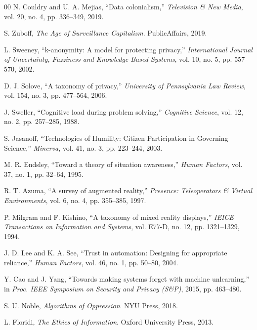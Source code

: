 \documentclass[conference]{IEEEtran}
\begin{document}
\begin{thebibliography}{00}
 N. Couldry and U. A. Mejias, ``Data colonialism,'' \textit{Television \& New Media}, vol. 20, no. 4, pp. 336--349, 2019.

 S. Zuboff, \textit{The Age of Surveillance Capitalism}. PublicAffairs, 2019.

 L. Sweeney, ``k-anonymity: A model for protecting privacy,'' \textit{International Journal of Uncertainty, Fuzziness and Knowledge-Based Systems}, vol. 10, no. 5, pp. 557--570, 2002.

 D. J. Solove, ``A taxonomy of privacy,'' \textit{University of Pennsylvania Law Review}, vol. 154, no. 3, pp. 477--564, 2006.

 J. Sweller, ``Cognitive load during problem solving,'' \textit{Cognitive Science}, vol. 12, no. 2, pp. 257--285, 1988.

 S. Jasanoff, ``Technologies of Humility: Citizen Participation in Governing Science,'' \textit{Minerva}, vol. 41, no. 3, pp. 223--244, 2003.

 M. R. Endsley, ``Toward a theory of situation awareness,'' \textit{Human Factors}, vol. 37, no. 1, pp. 32--64, 1995.

 R. T. Azuma, ``A survey of augmented reality,'' \textit{Presence: Teleoperators \& Virtual Environments}, vol. 6, no. 4, pp. 355--385, 1997.

 P. Milgram and F. Kishino, ``A taxonomy of mixed reality displays,'' \textit{IEICE Transactions on Information and Systems}, vol. E77-D, no. 12, pp. 1321--1329, 1994.

 J. D. Lee and K. A. See, ``Trust in automation: Designing for appropriate reliance,'' \textit{Human Factors}, vol. 46, no. 1, pp. 50--80, 2004.

 Y. Cao and J. Yang, ``Towards making systems forget with machine unlearning,'' in \textit{Proc. IEEE Symposium on Security and Privacy (S\&P)}, 2015, pp. 463--480.

 S. U. Noble, \textit{Algorithms of Oppression}. NYU Press, 2018.

 L. Floridi, \textit{The Ethics of Information}. Oxford University Press, 2013.

\end{thebibliography}
\end{document}
